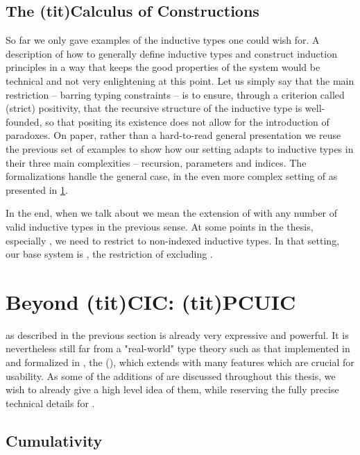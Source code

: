 \subsection{The \kl(tit){Calculus of Constructions}}

So far we only gave examples of the inductive types one could wish for.
A description of how to generally define inductive types and construct induction principles
in a way that keeps the good properties of the system would be technical and not
very enlightening at this point. Let us simply say that the main restriction – barring typing
constraints – is to ensure, through a criterion called (strict) positivity,
that the recursive structure of the inductive type
is well-founded, so that positing its existence does not allow for the
introduction of paradoxes.
On paper, rather than a hard-to-read general presentation we reuse the previous
set of examples to show how our setting adapts to inductive types in their
three main complexities – recursion, parameters and indices.
The formalizations handle the general case, in the even more complex setting of 
as presented in \cref{sec:tech-pcuic}.

In the end, when we talk about  we mean the extension of  with any number of
valid inductive types in the previous sense.
At some points in the thesis, especially , we need to restrict to
non-indexed inductive types. In that setting, our base system is ,
the restriction of  excluding .



\section{Beyond \kl(tit){CIC}: \kl(tit){PCUIC}}
\label{sec:tech-pcuic}

 as described in the previous section is already very expressive and powerful.
It is nevertheless
still far from a "real-world" type theory such as that implemented in  and
formalized in , the  (), which extends  with many features which are crucial
for usability. 
As some of the additions of  are discussed throughout this
thesis, we wish to already give a high level idea of them,
while reserving the fully precise technical details for .

\subsection{Cumulativity}

